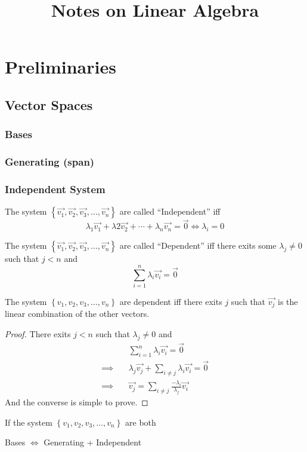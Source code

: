 


\title{Notes on Linear Algebra}

\maketitle

\chapter{Preliminaries}
\section{Vector Spaces}
\subsection{Bases}
\subsection{Generating (span)}
\subsection{Independent System}

\begin{definition}[Independent]
  The system $\left\{\vec{v_1},\vec{v_2},\vec{v_3},\dots,
  \vec{v_n}\right\}$ are 
  called ``Independent'' iff
  \[
    \lambda_1\vec{v_1}+\lambda2\vec{v_2}+\cdots+
    \lambda_n\vec{v_n}=\vec{0}
    \iff \lambda_i=0
  \]
\end{definition}
\begin{definition}[Dependent]
  The system $\left\{\vec{v_1},\vec{v_2},
  \vec{v_3},\dots,\vec{v_n}\right\}$ are 
  called ``Dependent'' iff there exits some 
  $\lambda_j\neq 0$ such that $j<n$ and 
  \[\sum_{i=1}^{n}\lambda_i\vec{v_i}=\vec{0}\]
\end{definition}
\begin{proposition}
  The system $\left\{v_1,v_2,v_3,\dots,v_n\right\}$ are 
  dependent iff there exits $j$ such that 
  $\vec{v_j}$ is the linear combination of the other vectors.
\end{proposition}
\begin{proof}
  There exits $j<n$ such that $\lambda_j\neq 0$ and 
  \begin{align*}
    &\sum_{i=1}^{n}\lambda_i\vec{v_i}=\vec{0}\\
    \implies\quad &\lambda_j\vec{v_j}+
    \sum_{i\neq j}\lambda_i\vec{v_i}=\vec{0}\\
    \implies\quad &
    \vec{v_j}=\sum_{i\neq j}\frac{-\lambda_i}{\lambda_j}\vec{v_i}
  \end{align*}
  And the converse is simple to prove.
\end{proof}
\begin{proposition}
  If the system $\left\{v_1,v_2,v_3,\dots,v_n\right\}$ are
  both 
\end{proposition}
\begin{proposition}
  Bases $\iff$ Generating + Independent
\end{proposition}




